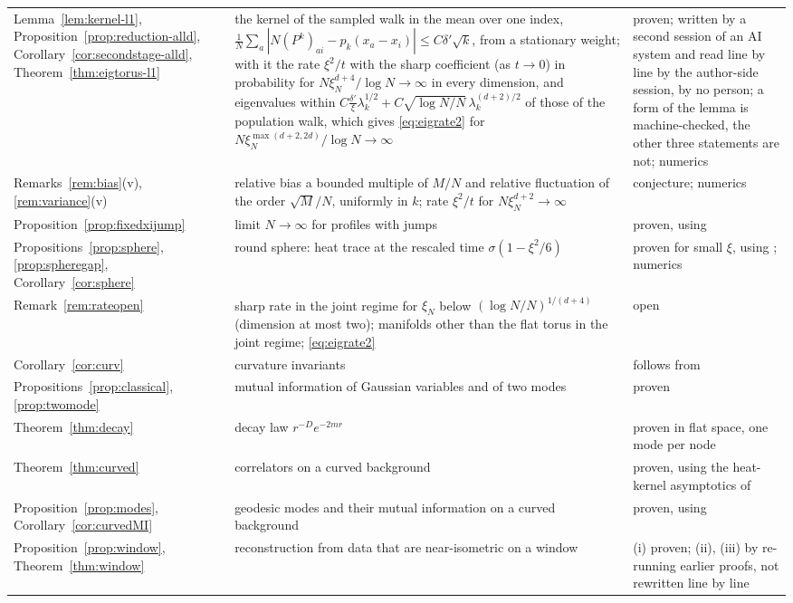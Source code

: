 \documentclass[11pt,a4paper]{article}
\theoremstyle{stmt}
\theoremstyle{defn}
\theoremstyle{rmk}
\numberwithin{equation}{section}
\begin{document}
{\begin{longtable}{@{}>{\raggedright\arraybackslash}p{}>{\raggedright\arraybackslash}p{}>{\raggedright\arraybackslash}p{}@{}}
Lemma~\ref{lem:kernel-l1}, Proposition~\ref{prop:reduction-alld}, Corollary~\ref{cor:secondstage-alld}, Theorem~\ref{thm:eigtorus-l1} & the kernel of the sampled walk in the mean over one index, $\frac1N\sum_a|N(P^k)_{ai}-p_k(x_a-x_i)|\le C\delta'\sqrt k$, from a stationary weight; with it the rate $\xi^2/t$ with the sharp coefficient (as $t\to0$) in probability for $N\xi_N^{d+4}/\log N\to\infty$ in every dimension, and eigenvalues within $C\frac{\delta'}\xi\lambda_k^{1/2}+C\sqrt{\log N/N}\,\lambda_k^{(d+2)/2}$ of those of the population walk, which gives \eqref{eq:eigrate2} for $N\xi_N^{\max(d+2,2d)}/\log N\to\infty$ & proven; written by a second session of an AI system and read line by line by the author-side session, by no person; a form of the lemma is machine-checked, the other three statements are not; numerics\\
Remarks~\ref{rem:bias}(v), \ref{rem:variance}(v) & relative bias a bounded multiple of $M/N$ and relative fluctuation of the order $\sqrt M/N$, uniformly in $k$; rate $\xi^2/t$ for $N\xi_N^{d+2}\to\infty$ & conjecture; numerics\\
Proposition~\ref{prop:fixedxijump} & limit $N\to\infty$ for profiles with jumps & proven, using \cite{vdVW}\\
Propositions~\ref{prop:sphere}, \ref{prop:spheregap}, Corollary~\ref{cor:sphere} & round sphere: heat trace at the rescaled time $\sigma(1-\xi^2/6)$ & proven for small $\xi$, using \cite{Szego}; numerics\\
Remark~\ref{rem:rateopen} & sharp rate in the joint regime for $\xi_N$ below $(\log N/N)^{1/(d+4)}$ (dimension at most two); manifolds other than the flat torus in the joint regime; \eqref{eq:eigrate2} & open\\
Corollary~\ref{cor:curv} & curvature invariants & follows from \cite{Gilkey}\\
Propositions~\ref{prop:classical}, \ref{prop:twomode} & mutual information of Gaussian variables and of two modes & proven\\
Theorem~\ref{thm:decay} & decay law $r^{-D}e^{-2mr}$ & proven in flat space, one mode per node\\
Theorem~\ref{thm:curved} & correlators on a curved background & proven, using the heat-kernel asymptotics of \cite{Ludewig}\\
Proposition~\ref{prop:modes}, Corollary~\ref{cor:curvedMI} & geodesic modes and their mutual information on a curved background & proven, using \cite{Ludewig}\\
Proposition~\ref{prop:window}, Theorem~\ref{thm:window} & reconstruction from data that are near-isometric on a window & (i) proven; (ii), (iii) by re-running earlier proofs, not rewritten line by line\\

\end{longtable}}
\end{document}
